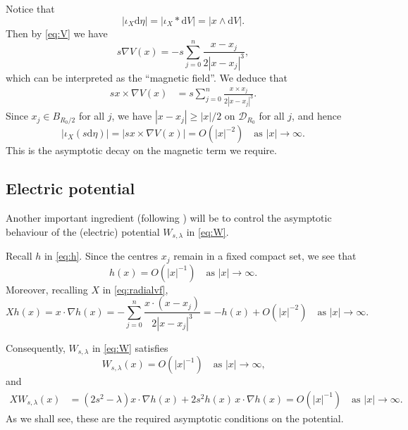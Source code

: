\documentclass{article}
\theoremstyle{definition}
\numberwithin{thm}{section}
\numberwithin{equation}{section}
\def\d{\mathrm{d}}
\newcommand{\dd}{\mathrm d}
\begin{document}
Notice that
\begin{equation}
    |\iota_X\dd\eta|=|\iota_X*\dd V|=|x\wedge \d V|.
\end{equation}
Then by \eqref{eq:V} we have
\begin{equation}\label{eq:Bs}
             s\nabla V(x)
        =-s\sum_{j=0}^n \frac{x-x_j}{2|x-x_j|^3},
\end{equation}  
which can be interpreted as the ``magnetic field''.    
We deduce that
\begin{align}\label{eq:cross}
        sx\times \nabla V(x) 
        &=s\sum_{j=0}^n  \frac{x\times x_j}{2|x-x_j|^3}.
\end{align}
Since $x_j\in B_{R_0/2}$ for all $j$, we have $|x-x_j|\geq |x|/2$  on $\mathcal{D}_{R_0}$ for all $j$, and hence
\begin{equation}\label{eq:beta-zero}
    |\iota_X(s\dd\eta)|=    |sx\times \nabla V(x)|=O(|x|^{-2})\quad\text{as $|x|\to\infty$.}
\end{equation}
This is the  asymptotic decay on the magnetic term we require.
 

\subsection{Electric potential}

Another important ingredient (following \cite{AHK})  will be to control the asymptotic behaviour of the (electric) potential $W_{s,\lambda}$ in \eqref{eq:W}.

Recall $h$ in \eqref{eq:h}.   Since the centres $x_j$ remain in a fixed compact set, we   see that
\begin{equation}\label{eq:hdecay1}
        h(x)=O(|x|^{-1})\quad\text{as $|x|\to\infty$.}
\end{equation}
Moreover, recalling $X$ in \eqref{eq:radialvf}, 
\begin{equation}
      Xh(x)=  x\cdot\nabla h(x)
        =-\sum_{j=0}^n \frac{x\cdot(x-x_j)}{2|x-x_j|^3}
        =-h(x)+O(|x|^{-2})\quad\text{as $|x|\to\infty$.}
\end{equation}

Consequently, $W_{s,\lambda}$ in \eqref{eq:W} satisfies
\begin{equation}\label{eq:Wdecay}
        W_{s,\lambda}(x)=O(|x|^{-1})\quad\text{as $|x|\to\infty$,}
\end{equation}
and
\begin{align}\label{eq:XWdecay}
     XW_{s,\lambda}(x) %
        &=(2s^2-\lambda)x\cdot\nabla h(x)
          +2s^2h(x)\,x\cdot\nabla h(x)     =O(|x|^{-1})\quad\text{as $|x|\to\infty$.}
\end{align}
As we shall see, these are the required asymptotic conditions on the potential.
\end{document}
